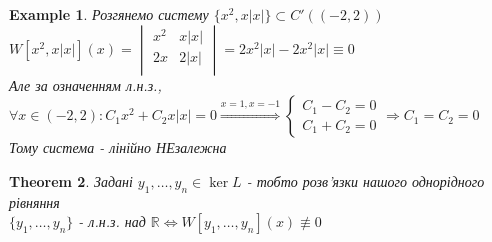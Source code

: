 \documentclass[a4paper, 10pt]{article}
\theoremstyle{theoremdd}
\newtheorem{theorem}{Theorem}[subsection]
\theoremstyle{theoremdd}
\theoremstyle{theoremdd}
\theoremstyle{theoremdd}
\newtheorem{example}[theorem]{Example}
\theoremstyle{theoremdd}
\theoremstyle{theoremdd}
\theoremstyle{theoremdd}
\theoremstyle{theoremdd}
\begin{document}
\begin{example}
 Розгянемо систему $\{x^2, x|x|\} \subset C'((-2,2))$\\
$\displaystyle W[x^2, x|x|](x) = 
\begin{vmatrix} 
	x^2 &  x|x| \\
	2x &  2|x| \\ 
\end{vmatrix} = 2x^2|x| - 2x^2|x| \equiv 0$\\
Але за означенням л.н.з.,\\
$\displaystyle \forall x \in (-2,2): C_1x^2 + C_2 x|x| = 0  \overset{x = 1, x = -1}{\Rightarrow}
\begin{cases}
C_1 - C_2 = 0\\
C_1 + C_2 = 0
\end{cases} \Rightarrow C_1 = C_2 = 0
$\\
Тому система - лінійно НЕзалежна
\end{example}

\begin{theorem}
Задані $y_1, \dots, y_n \in \ker L$ - тобто розв'язки нашого однорідного рівняння\\
$\{y_1, \dots, y_n\}$ - л.н.з. над $\mathbb{R} \iff W[y_1, \dots, y_n](x) \not\equiv 0$
\end{theorem}
\end{document}
